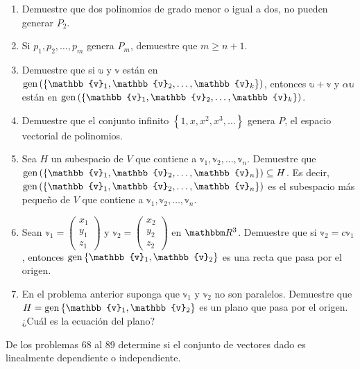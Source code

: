 \begin{enumerate}[resume]
    \item Demuestre que dos polinomios de grado menor o igual a dos, no pueden generar $P_{2}$.
    \item Si $p_{1}, p_{2}, \dots, p_{m}$ genera $P_{m}$, demuestre que $m \geq n+1$.
    \item Demuestre que si $\mathbb{u}$ y $\mathbb{v}$ están en $\Gen \left( \left\{\mathbb{v}_{1}, \mathbb{v}_{2}, \dots, \mathbb{v}_{k}\right\} \right)$, entonces $\mathbb{u}+\mathbb{v}$ y $\alpha \mathbb{u}$ están en $\Gen \left( \left\{\mathbb{v}_{1}, \mathbb{v}_{2}, \dots, \mathbb{v}_{k}\right\} \right)$.
    \item Demuestre que el conjunto infinito $\left\{1, x, x^{2}, x^{3}, \dots\right\}$ genera $P$, el espacio vectorial de polinomios.
    \item Sea $H$ un subespacio de $V$ que contiene a $\mathbb{v}_{1}, \mathbb{v}_{2}, \dots, \mathbb{v}_{n}$. Demuestre que $\Gen \left( \left\{\mathbb{v}_{1}, \mathbb{v}_{2}, \dots, \mathbb{v}_{n}\right\} \right) \subseteq H$. Es decir, $\Gen \left( \left\{\mathbb{v}_{1}, \mathbb{v}_{2}, \dots, \mathbb{v}_{n}\right\} \right)$ es el subespacio más pequeño de $V$ que contiene a $\mathbb{v}_{1}, \mathbb{v}_{2}, \dots, \mathbb{v}_{n}$.
    \item Sean $\mathbb{v}_{1}=\begin{pmatrix} x_{1} \\ y_{1} \\ z_{1} \end{pmatrix}$ y $\mathbb{v}_{2}=\begin{pmatrix} x_{2} \\ y_{2} \\ z_{2} \end{pmatrix}$ en $\RR[3]$. Demuestre que si $\mathbb{v}_{2}=c \mathbb{v}_{1}$, entonces $\Gen \left\{\mathbb{v}_{1}, \mathbb{v}_{2}\right\}$ es una recta que pasa por el origen.
    \item En el problema anterior suponga que $\mathbb{v}_{1}$ y $\mathbb{v}_{2}$ no son paralelos. Demuestre que $H= \Gen \left\{\mathbb{v}_{1}, \mathbb{v}_{2}\right\}$ es un plano que pasa por el origen. ¿Cuál es la ecuación del plano?
\end{enumerate}
De los problemas 68 al 89 determine si el conjunto de vectores dado es linealmente dependiente o independiente.
